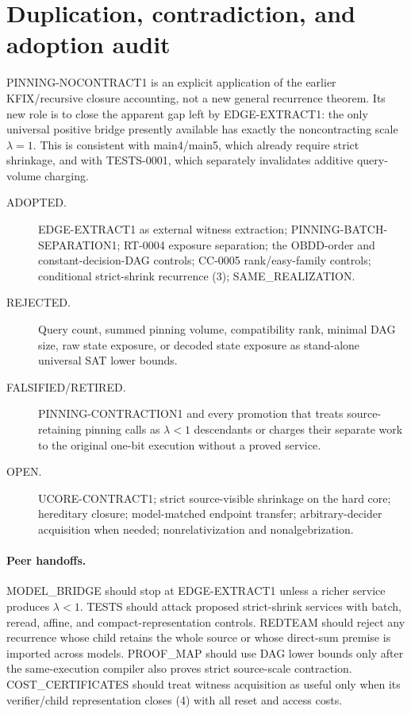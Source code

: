 \documentclass[11pt]{article}
\begin{document}
\section{Duplication, contradiction, and adoption audit}
PINNING-NOCONTRACT1 is an explicit application of the earlier KFIX/recursive
closure accounting, not a new general recurrence theorem.  Its new role is
to close the apparent gap left by EDGE-EXTRACT1: the only universal positive
bridge presently available has exactly the noncontracting scale
$\lambda=1$.  This is consistent with main4/main5, which already require
strict shrinkage, and with TESTS-0001, which separately invalidates additive
query-volume charging.

\begin{description}
\item[ADOPTED.] EDGE-EXTRACT1 as external witness extraction;
PINNING-BATCH-SEPARATION1; RT-0004 exposure separation; the OBDD-order and
constant-decision-DAG controls; CC-0005 rank/easy-family controls; conditional
strict-shrink recurrence (3); SAME\allowbreak\_REALIZATION.
\item[REJECTED.] Query count, summed pinning volume, compatibility rank,
minimal DAG size, raw state exposure, or decoded state exposure as stand-alone
universal SAT lower bounds.
\item[FALSIFIED/RETIRED.] PINNING-CONTRACTION1 and every promotion that treats
source-retaining pinning calls as $\lambda<1$ descendants or charges their
separate work to the original one-bit execution without a proved service.
\item[OPEN.] UCORE-CONTRACT1; strict source-visible shrinkage on the hard
core; hereditary closure; model-matched endpoint transfer; arbitrary-decider
acquisition when needed; nonrelativization and nonalgebrization.
\end{description}

\paragraph{Peer handoffs.}
MODEL\_BRIDGE should stop at EDGE-EXTRACT1 unless a richer service produces
$\lambda<1$.  TESTS should attack proposed strict-shrink services with batch,
reread, affine, and compact-representation controls.  REDTEAM should reject
any recurrence whose child retains the whole source or whose direct-sum
premise is imported across models.  PROOF\_MAP should use DAG lower bounds
only after the same-execution compiler also proves strict source-scale
contraction.  COST\_CERTIFICATES should treat witness acquisition as useful
only when its verifier/child representation closes (4) with all reset and
access costs.
\end{document}
